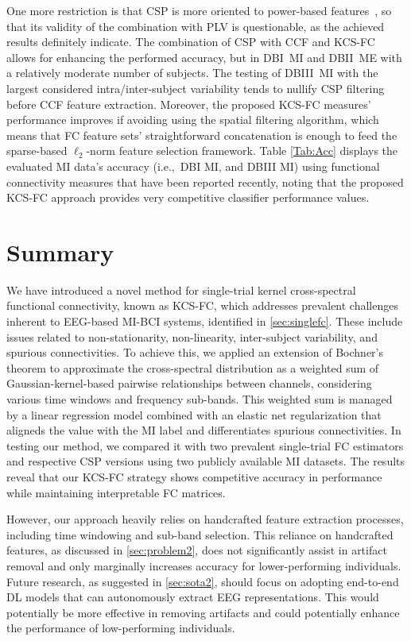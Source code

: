 One more restriction is that CSP is more oriented to power-based features~\cite{kumar2018eeg}, so that its validity of the combination with PLV is questionable, as the achieved results definitely indicate. The combination of CSP with CCF and KCS-FC allows for enhancing the performed accuracy, but in DBI~MI and DBII~ME with a relatively moderate number of subjects. The testing of DBIII~MI with the largest considered intra/inter-subject variability tends to nullify CSP filtering before CCF feature extraction. Moreover, the proposed KCS-FC measures' performance improves if avoiding using the spatial filtering algorithm, which means that FC feature sets' straightforward concatenation is enough to feed the sparse-based $\ell_2$-norm feature selection framework. Table \ref{Tab:Acc} displays the evaluated MI data's accuracy (i.e.,~DBI MI, and DBIII MI) using functional connectivity measures that have been reported recently, noting that the proposed KCS-FC approach provides very competitive classifier performance values.



\section{Summary}

We have introduced a novel method for single-trial kernel cross-spectral functional connectivity, known as KCS-FC, which addresses prevalent challenges inherent to EEG-based MI-BCI systems, identified in \cref{sec:singlefc}. These include issues related to non-stationarity, non-linearity, inter-subject variability, and spurious connectivities. To achieve this, we applied an extension of Bochner's theorem to approximate the cross-spectral distribution as a weighted sum of Gaussian-kernel-based pairwise relationships between channels, considering various time windows and frequency sub-bands. This weighted sum is managed by a linear regression model combined with an elastic net regularization that aligneds the value with the MI label and differentiates spurious connectivities. In testing our method, we compared it with two prevalent single-trial FC estimators and respective CSP versions using two publicly available MI datasets. The results reveal that our KCS-FC strategy shows competitive accuracy in performance while maintaining interpretable FC matrices.

However, our approach heavily relies on handcrafted feature extraction processes, including time windowing and sub-band selection. This reliance on handcrafted features, as discussed in \cref{sec:problem2}, does not significantly assist in artifact removal and only marginally increases accuracy for lower-performing individuals. Future research, as suggested in \cref{sec:sota2}, should focus on adopting end-to-end DL models that can autonomously extract EEG representations. This would potentially be more effective in removing artifacts and could potentially enhance the performance of low-performing individuals.
